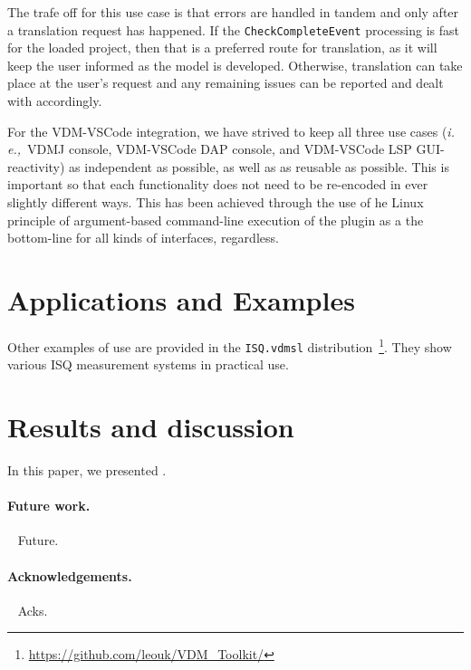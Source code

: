 \documentclass[runningheads,a4paper]{llncs}
\newcommand{\ie}{{\em i.\,e.,\/}}
\begin{document}
The trafe off for this use case is that errors are handled in tandem and only after a translation request has happened. If the \texttt{CheckCompleteEvent} processing is fast for the loaded project, then that is a preferred route for translation, as it will keep the user informed as the model is developed. Otherwise, translation can take place at the user's request and any remaining issues can be reported and dealt with accordingly.  

For the VDM-VSCode integration, we have strived to keep all three use cases (\ie~VDMJ console, VDM-VSCode DAP console, and VDM-VSCode LSP GUI-reactivity) as independent as possible, as well as as reusable as possible. This is important so that each functionality does not need to be re-encoded in ever slightly different ways. This has been achieved through the use of he Linux principle of argument-based command-line execution of the plugin as a the bottom-line for all kinds of interfaces, regardless.    

\section{Applications and Examples}\label{sec:Examples}

Other examples of use are provided in the \texttt{ISQ.vdmsl} distribution~\footnote{\url{https://github.com/leouk/VDM_Toolkit/}}. They show various ISQ measurement systems in practical use.

\section{Results and discussion}\label{sec:Results}

In this paper, we presented .

\paragraph*{Future work.}~
%
Future.

\paragraph*{Acknowledgements.}~
%
Acks.


%


\end{document}
